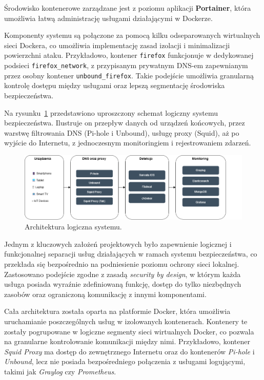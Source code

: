 \documentclass[
    left=2.5cm,         %
    right=2.5cm,        %
    top=2.5cm,          %
    bottom=3cm,         %
    bindingoffset=6mm,  %
    nohyphenation=true %
]{eiti/eiti-thesis} %
\begin{document}
Środowisko kontenerowe zarządzane jest z poziomu aplikacji \textbf{Portainer}, która umożliwia łatwą administrację usługami działającymi w Dockerze.

Komponenty systemu są połączone za pomocą kilku odseparowanych wirtualnych sieci Dockera, co umożliwia implementację zasad izolacji i minimalizacji powierzchni ataku. Przykładowo, kontener \texttt{firefox} funkcjonuje w dedykowanej podsieci \texttt{firefox\_network}, z przypisanym prywatnym DNS-em zapewnianym przez osobny kontener \texttt{unbound\_firefox}. Takie podejście umożliwia granularną kontrolę dostępu między usługami oraz lepszą segmentację środowiska bezpieczeństwa.

Na rysunku~\ref{fig:architektura} przedstawiono uproszczony schemat logiczny systemu bezpieczeństwa. Ilustruje on przepływ danych od urządzeń końcowych, przez warstwę filtrowania DNS (Pi-hole i Unbound), usługę proxy (Squid), aż po wyjście do Internetu, z jednoczesnym monitoringiem i rejestrowaniem zdarzeń.

\begin{figure}[H]
    \centering
    \includegraphics[width=\textwidth]{img/home-network-guardian.drawio.png}
    \caption{Architektura logiczna systemu.}
    \label{fig:architektura}
\end{figure}

Jednym z kluczowych założeń projektowych było zapewnienie logicznej i funkcjonalnej separacji usług działających w ramach systemu bezpieczeństwa, co przekłada się bezpośrednio na podniesienie poziomu ochrony sieci lokalnej. Zastosowano podejście zgodne z zasadą \textit{security by design}, w którym każda usługa posiada wyraźnie zdefiniowaną funkcję, dostęp do tylko niezbędnych zasobów oraz ograniczoną komunikację z innymi komponentami.

Cała architektura została oparta na platformie Docker\cite{docker-docs}, która umożliwia uruchamianie poszczególnych usług w izolowanych kontenerach. Kontenery te zostały pogrupowane w logiczne segmenty sieci wirtualnych Docker, co pozwala na granularne kontrolowanie komunikacji między nimi. Przykładowo, kontener \textit{Squid Proxy} ma dostęp do zewnętrznego Internetu oraz do kontenerów \textit{Pi-hole} i \textit{Unbound}, lecz nie posiada bezpośredniego połączenia z usługami logującymi, takimi jak \textit{Graylog} czy \textit{Prometheus}.
\end{document}
